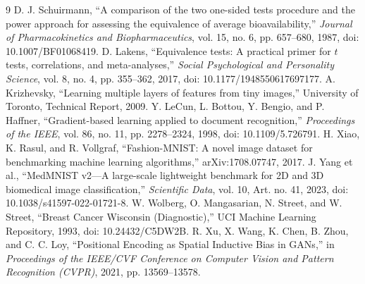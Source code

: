 \documentclass[11pt]{article}
\begin{document}
\begin{thebibliography}{9}
 D. J. Schuirmann, ``A comparison of the two one-sided tests procedure and the power approach for assessing the equivalence of average bioavailability,'' \textit{Journal of Pharmacokinetics and Biopharmaceutics}, vol. 15, no. 6, pp. 657--680, 1987, doi: 10.1007/BF01068419.
 D. Lakens, ``Equivalence tests: A practical primer for $t$ tests, correlations, and meta-analyses,'' \textit{Social Psychological and Personality Science}, vol. 8, no. 4, pp. 355--362, 2017, doi: 10.1177/1948550617697177.
 A. Krizhevsky, ``Learning multiple layers of features from tiny images,'' University of Toronto, Technical Report, 2009.
 Y. LeCun, L. Bottou, Y. Bengio, and P. Haffner, ``Gradient-based learning applied to document recognition,'' \textit{Proceedings of the IEEE}, vol. 86, no. 11, pp. 2278--2324, 1998, doi: 10.1109/5.726791.
 H. Xiao, K. Rasul, and R. Vollgraf, ``Fashion-MNIST: A novel image dataset for benchmarking machine learning algorithms,'' arXiv:1708.07747, 2017.
 J. Yang et al., ``MedMNIST v2---A large-scale lightweight benchmark for 2D and 3D biomedical image classification,'' \textit{Scientific Data}, vol. 10, Art. no. 41, 2023, doi: 10.1038/s41597-022-01721-8.
 W. Wolberg, O. Mangasarian, N. Street, and W. Street, ``Breast Cancer Wisconsin (Diagnostic),'' UCI Machine Learning Repository, 1993, doi: 10.24432/C5DW2B.
 R. Xu, X. Wang, K. Chen, B. Zhou, and C. C. Loy, ``Positional Encoding as Spatial Inductive Bias in GANs,'' in \textit{Proceedings of the IEEE/CVF Conference on Computer Vision and Pattern Recognition (CVPR)}, 2021, pp. 13569--13578.
\end{thebibliography}
\end{document}
